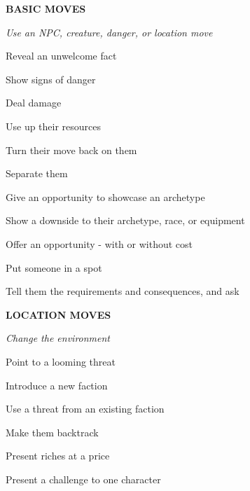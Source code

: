 \documentclass[oneside,10pt]{article}
\begin{document}
\begin{multicols}{2}
\textbf{BASIC MOVES}
\begin{dent}
\setlength{\parskip}{.1em}\itshape
Use an NPC, creature, danger, or location move

Reveal an unwelcome fact

Show signs of danger

Deal damage

Use up their resources

Turn their move back on them

Separate them

Give an opportunity to showcase an archetype

Show a downside to their archetype, race, or
equipment

Offer an opportunity - with or without cost

Put someone in a spot

Tell them the requirements and consequences, and
ask
\end{dent}

\textbf{LOCATION MOVES}
\begin{dent}
\setlength{\parskip}{.1em}
\itshape
Change the environment

Point to a looming threat

Introduce a new faction

Use a threat from an existing faction

Make them backtrack

Present riches at a price

Present a challenge to one character
\end{dent}

\end{multicols}
\end{document}
